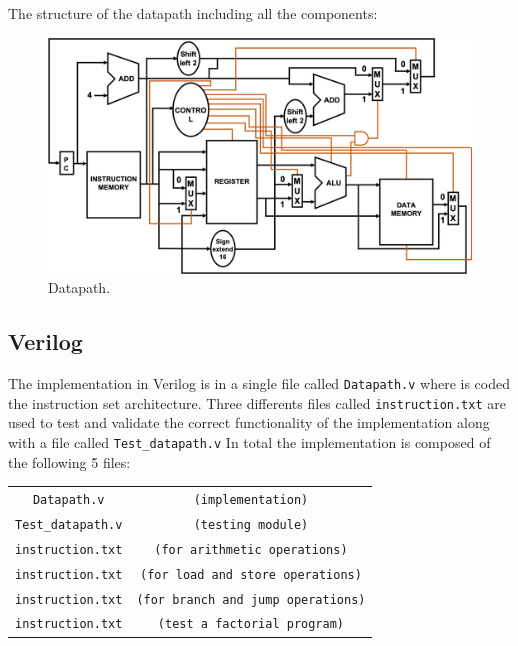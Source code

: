 \documentclass[conference]{IEEEtran}
\begin{document}
The structure of the datapath including all the components:
\begin{figure}[h]
\includegraphics[scale=0.3]{MIPS_Datapath.png}
\caption{Datapath.}
\end{figure}

\subsection{Verilog}
The implementation in Verilog is in a single file called \verb$Datapath.v$ where is coded the instruction set architecture. Three differents files called \verb$instruction.txt$ are used to test and validate the correct functionality of the implementation along with a file called \verb$Test_datapath.v$
In total the implementation is composed of the following 5 files:

\begin{table}[htbp]
\begin{center}
\begin{tabular}{c c}
\verb$Datapath.v$&\verb$(implementation)$\\
\verb$Test_datapath.v$&\verb$(testing module)$\\
\verb$instruction.txt$&\verb$(for arithmetic operations)$\\
\verb$instruction.txt$&\verb$(for load and store operations)$\\
\verb$instruction.txt$&\verb$(for branch and jump operations)$\\
\verb$instruction.txt$&\verb$(test a factorial program)$\\
\end{tabular}
\end{center}
\end{table}
\end{document}

